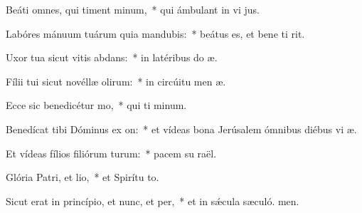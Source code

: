 \item Beáti omnes, qui timent minum,~* qui ámbulant in vi jus.
\item Labóres mánuum tuárum quia mandubis:~* beátus es, et bene ti rit.
\item Uxor tua sicut vitis abdans:~* in latéribus do æ.
\item Fílii tui sicut novéllæ olirum:~* in circúitu men æ.
\item Ecce sic benedicétur mo,~* qui ti minum.
\item Benedícat tibi Dóminus ex on:~* et vídeas bona Jerúsalem ómnibus diébus vi æ.
\item Et vídeas fílios filiórum turum:~* pacem su raël.
\item Glória Patri, et lio,~* et Spirítu to.
\item Sicut erat in princípio, et nunc, et per,~* et in sǽcula sæculó. men.
